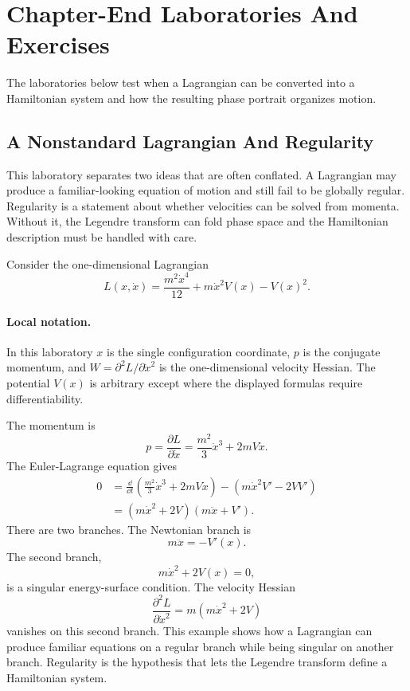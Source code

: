 \section{Chapter-End Laboratories And Exercises}
\label{sec:hamiltonian-chapter-end-labs}

The laboratories below test when a Lagrangian can be converted into a
Hamiltonian system and how the resulting phase portrait organizes motion.

\subsection{A Nonstandard Lagrangian And Regularity}
\label{sec:lab-nonstandard-lagrangian}

This laboratory separates two ideas that are often conflated. A Lagrangian may
produce a familiar-looking equation of motion and still fail to be globally
regular. Regularity is a statement about whether velocities can be solved from
momenta. Without it, the Legendre transform can fold phase space and the
Hamiltonian description must be handled with care.

Consider the one-dimensional Lagrangian
\[
  L(x,\dot x)
  =
  \frac{m^2\dot x^4}{12}
  +
  m\dot x^2V(x)
  -
  V(x)^2.
\]

\paragraph{Local notation.}
In this laboratory \(x\) is the single configuration coordinate, \(p\) is the
conjugate momentum, and \(W=\partial^2L/\partial\dot x^2\) is the
one-dimensional velocity Hessian.  The potential \(V(x)\) is arbitrary except
where the displayed formulas require differentiability.

The momentum is
\[
  p=\frac{\partial L}{\partial\dot x}
  =
  \frac{m^2}{3}\dot x^3+2mV\dot x.
\]
The Euler-Lagrange equation gives
\[
\begin{aligned}
  0
  &=
  \frac{\dd}{\dd t}
  \left(
    \frac{m^2}{3}\dot x^3+2mV\dot x
  \right)
  -
  \left(
    m\dot x^2V'-2VV'
  \right)\\
  &=
  (m\dot x^2+2V)(m\ddot x+V').
\end{aligned}
\]
There are two branches. The Newtonian branch is
\[
  m\ddot x=-V'(x).
\]
The second branch,
\[
  m\dot x^2+2V(x)=0,
\]
is a singular energy-surface condition. The velocity Hessian
\[
  \frac{\partial^2L}{\partial\dot x^2}
  =
  m(m\dot x^2+2V)
\]
vanishes on this second branch. This example shows how a Lagrangian
can produce familiar equations on a regular branch while being singular on
another branch. Regularity is the hypothesis that lets the Legendre transform
define a Hamiltonian system.

